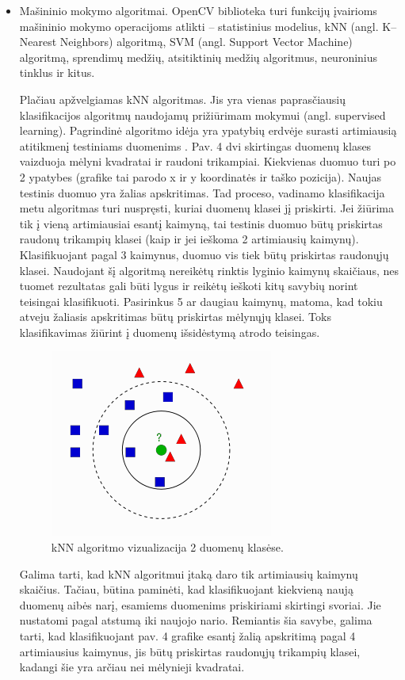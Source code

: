 \documentclass[a4paper,12pt]{article}
\begin{document}
\begin{itemize}
	\item Mašininio mokymo algoritmai. OpenCV biblioteka turi funkcijų įvairioms mašininio mokymo operacijoms atlikti – statistinius modelius, kNN (angl. K–Nearest Neighbors) algoritmą, SVM (angl. Support Vector Machine) algoritmą, sprendimų medžių, atsitiktinių medžių algoritmus, neuroninius tinklus ir kitus.
	
	Plačiau apžvelgiamas kNN algoritmas. Jis yra vienas paprasčiausių klasifikacijos algoritmų naudojamų prižiūrimam mokymui (angl. supervised learning). Pagrindinė algoritmo idėja yra ypatybių erdvėje surasti artimiausią atitikmenį testiniams duomenims \cite{KNN}. Pav. 4 dvi skirtingas duomenų klases vaizduoja mėlyni kvadratai ir raudoni trikampiai. Kiekvienas duomuo turi po 2 ypatybes (grafike tai parodo x ir y koordinatės ir taško pozicija). Naujas testinis duomuo yra žalias apskritimas. Tad proceso, vadinamo klasifikacija metu algoritmas turi nuspręsti, kuriai duomenų klasei jį priskirti. Jei žiūrima tik į vieną artimiausiai esantį kaimyną, tai testinis duomuo būtų priskirtas raudonų trikampių klasei (kaip ir jei ieškoma 2 artimiausių kaimynų). Klasifikuojant pagal 3 kaimynus, duomuo vis tiek būtų priskirtas raudonųjų klasei. Naudojant šį algoritmą nereikėtų rinktis lyginio kaimynų skaičiaus, nes tuomet rezultatas gali būti lygus ir reikėtų ieškoti kitų savybių norint teisingai klasifikuoti. Pasirinkus 5 ar daugiau kaimynų, matoma, kad tokiu atveju žaliasis apskritimas būtų priskirtas mėlynųjų klasei. Toks klasifikavimas žiūrint į duomenų išsidėstymą atrodo teisingas.
		\begin{figure}[H]
			\centering
			\includegraphics[scale=0.6]{images/knn}
			\caption{kNN algoritmo vizualizacija 2 duomenų klasėse.}   %
			\label{img:knn}
		\end{figure}
	Galima tarti, kad kNN algoritmui įtaką daro tik artimiausių kaimynų skaičius. Tačiau, būtina paminėti, kad klasifikuojant kiekvieną naują duomenų aibės narį, esamiems duomenims priskiriami skirtingi svoriai. Jie nustatomi pagal atstumą iki naujojo nario. Remiantis šia savybe, galima tarti, kad klasifikuojant pav. 4 grafike esantį žalią apskritimą pagal 4 artimiausius kaimynus, jis būtų priskirtas raudonųjų trikampių klasei, kadangi šie yra arčiau nei mėlynieji kvadratai.
\end{itemize} 
\end{document}
